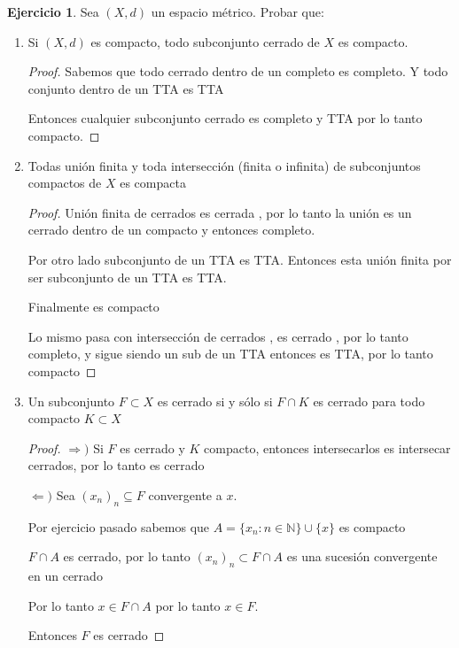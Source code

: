 \documentclass[11pt]{report}
\newcommand{\N}{\mathbb{N}}
\newcommand{\Ra}{\Rightarrow}
\theoremstyle{definition}
\newtheorem{ej}{Ejercicio}
\begin{document}
	\begin{ej} Sea $(X,d)$ un espacio métrico. Probar que:
		\begin{enumerate}
			\item Si $(X,d)$ es compacto, todo subconjunto cerrado de $X$ es compacto.
				\begin{proof}
					Sabemos que todo cerrado dentro de un completo es completo. Y todo conjunto dentro de un TTA es TTA

					Entonces cualquier subconjunto cerrado es completo y TTA por lo tanto compacto.
				\end{proof}
			\item Todas unión finita y toda intersección (finita o infinita) de subconjuntos compactos de $X$ es compacta
				\begin{proof}
					Unión finita de cerrados es cerrada , por lo tanto la unión es un cerrado dentro de un compacto y entonces completo.

					Por otro lado subconjunto de un TTA es TTA. Entonces esta unión finita por ser subconjunto de un TTA es TTA.

					Finalmente es compacto

					Lo mismo pasa con intersección de cerrados , es cerrado , por lo tanto completo, y sigue siendo un sub de un TTA entonces es TTA, por lo tanto compacto
				\end{proof}
			\item Un subconjunto $F \subset X$ es cerrado si y sólo si $F \cap K$ es cerrado para todo compacto $K \subset X$
				\begin{proof}
					$\Ra )$ Si $F$ es cerrado y $K$	compacto, entonces intersecarlos es intersecar cerrados, por lo tanto es cerrado

					$\Leftarrow )$ Sea $(x_n)_n \subseteq F$ convergente a $x$. 

					Por ejercicio pasado sabemos que $A = \{x_n : n \in \N\} \cup \{x\}$ es compacto

					$F \cap A$ es cerrado, por lo tanto $(x_n)_n \subset F \cap A$ es una sucesión convergente en un cerrado

					Por lo tanto $x \in F \cap A$ por lo tanto $x \in F$.

					Entonces $F$ es cerrado
				\end{proof}
		\end{enumerate}
	\end{ej}
	
\end{document}
